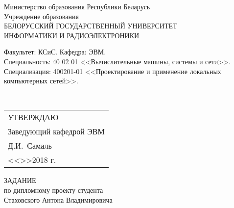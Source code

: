{
  \thispagestyle{empty}
    \setlength{\parindent}{0em}

    \newcommand{\lineunderscore}{\uline{\hspace*{\fill}}}
    \newcommand\tab[1][1cm]{\hspace*{#1}}

    \begin{center}
	    Министерство образования Республики Беларусь\\[1em]
	    Учреждение образования\\
	    БЕЛОРУССКИЙ ГОСУДАРСТВЕННЫЙ УНИВЕРСИТЕТ \\
	    ИНФОРМАТИКИ И РАДИОЭЛЕКТРОНИКИ\\[1em]
    \end{center}

    \begin{minipage}{\textwidth}
	    \begin{flushleft}
		    Факультет: КСиС. Кафедра: ЭВМ. \\
		    Специальность: 40 02 01 <<Вычислительные машины, системы и сети>>.
		    Специализация: 400201-01 <<Проектирование и применение локальных компьютерных сетей>>.
	    \end{flushleft}
    \end{minipage}\\[1em]

    \begin{minipage}{\textwidth}
	    \begin{flushright}
		    \begin{tabular}{p{}}
			    УТВЕРЖДАЮ \\
			    Заведующий кафедрой ЭВМ \\
			    \underline{\hspace*{5em}}Д.И.~Самаль \\
			    <<\underline{\hspace*{4ex}}>>\underline{\hspace*{6em}}2018 г.
		    \end{tabular}
	    \end{flushright}
    \end{minipage}

    \begin{center}
	    ЗАДАНИЕ \\
	    по дипломному проекту студента \\
	    Стаховского Антона Владимировича
    \end{center}

}
